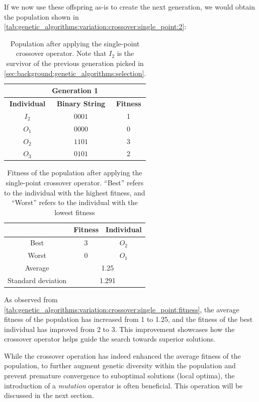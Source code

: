   If we now use these offspring as-is to create the next generation, we would obtain the
  population shown in \vref{tab:genetic_algorithms:variation:crossover:single_point:2}:

  \begin{table}[ht!]
    \centering
    \begin{tabular}{c | c | c }
      \multicolumn{3}{c}{\textbf{Generation 1}} \\
      \hline
      \hline
      \textbf{Individual} & \textbf{Binary String}  & \textbf{Fitness} \\
      \hline
      \(I_2\)             & \(0001\)                & 1 \\
      \(O_1\)             & \(0000\)                & 0 \\
      \(O_2\)             & \(1101\)                & 3 \\
      \(O_3\)             & \(0101\)                & 2
    \end{tabular}
    \caption{
      Population after applying the single-point crossover operator.
      Note that \(I_2\) is the survivor of the previous generation picked in 
      \vref{sec:background:genetic_algorithms:selection}.
    }
    \label{tab:genetic_algorithms:variation:crossover:single_point:2}
  \end{table}

  \begin{table}[H]
    \centering
    \begin{tabular}{|c|c|c|}
      \hline
            & \textbf{Fitness} & \textbf{Individual}  \\
      \hline
      Best  & 3 & \(O_2\) \\
      Worst & 0 & \(O_1\) \\
      \hline
      \hline
      Average & \multicolumn{2}{c|}{1.25} \\
      \hline
      Standard deviation & \multicolumn{2}{c|}{1.291} \\
      \hline
    \end{tabular}
    \caption{
      Fitness of the population after applying the single-point crossover operator.
      \enquote{Best} refers to the individual with the highest fitness, and \enquote{Worst} refers 
      to the individual with the lowest fitness
    }
    \label{tab:genetic_algorithms:variation:crossover:single_point:fitness}
  \end{table}

  As observed from \vref{tab:genetic_algorithms:variation:crossover:single_point:fitness}, the 
  average fitness of the population has increased from 1 to 1.25, and the fitness of the best 
  individual has improved from 2 to 3. 
  This improvement showcases how the crossover operator helps guide the search towards superior 
  solutions.

  While the crossover operation has indeed enhanced the average fitness of the population, to 
  further augment genetic diversity within the population and prevent premature convergence to 
  suboptimal solutions (local optima), the introduction of a \emph{mutation} operator is often 
  beneficial. 
  This operation will be discussed in the next section.

